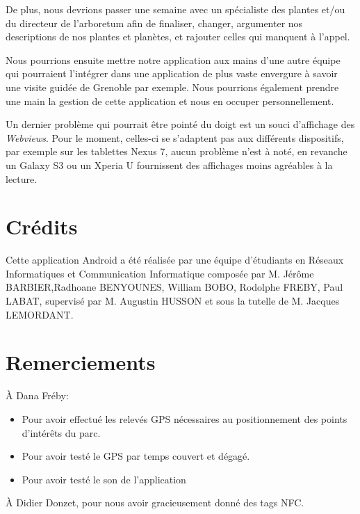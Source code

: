 \documentclass[a4paper,11pt]{article}
\begin{document}
De plus, nous devrions passer une semaine avec un spécialiste des plantes et/ou du directeur de l'arboretum afin de finaliser, changer, argumenter nos descriptions de nos plantes et planètes, et rajouter celles qui manquent à l'appel.

Nous pourrions ensuite mettre notre application aux mains d'une autre équipe qui pourraient l’intégrer dans une application de plus vaste envergure à savoir une visite guidée de Grenoble par exemple. Nous pourrions également prendre une main la gestion de cette application et nous en occuper personnellement.
		
		Un dernier problème qui pourrait être pointé du doigt est un souci d'affichage des \emph{Webviews}. Pour le moment, celles-ci se s'adaptent pas aux différents dispositifs, par exemple sur les tablettes Nexus 7, aucun problème n'est à noté, en revanche un Galaxy S3 ou un Xperia U fournissent des affichages moins agréables à la lecture.
		
    \section{Crédits}
		
    Cette application Android a été réalisée par une équipe d'étudiants en Réseaux Informatiques et Communication Informatique composée par 
    M. Jérôme BARBIER,Radhoane BENYOUNES, William BOBO, Rodolphe FREBY, Paul LABAT, supervisé par M. Augustin HUSSON et sous la tutelle 
    de M. Jacques LEMORDANT.

    \section{Remerciements}
    À Dana Fréby:
    \begin{itemize}
     \item Pour avoir effectué les relevés GPS nécessaires au positionnement des points d'intérêts du parc.
     \item Pour avoir testé le GPS par temps couvert et dégagé. 
     \item Pour avoir testé le son de l'application
    \end{itemize}
    
  À Didier Donzet, pour nous avoir gracieusement donné des tags NFC.
\end{document}
